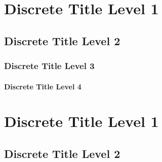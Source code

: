 \section*{Discrete Title Level 1}

\subsection*{Discrete Title Level 2}

\subsubsection*{Discrete Title Level 3}

\paragraph*{Discrete Title Level 4}


\section*{Discrete Title Level 1}

\subsection*{Discrete Title Level 2}
